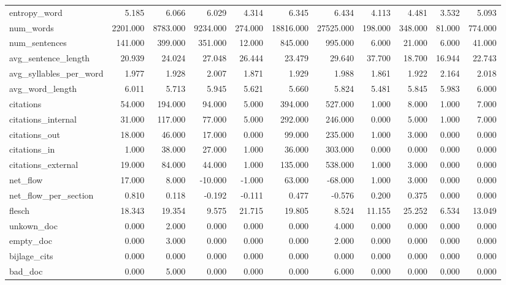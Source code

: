 \begin{tabular}{lrrrrrrrrrr}
\cline{1-11}
entropy\_word & 5.185 & 6.066 & 6.029 & 4.314 & 6.345 & 6.434 & 4.113 & 4.481 & 3.532 & 5.093 \\
\cline{1-11}
num\_words & 2201.000 & 8783.000 & 9234.000 & 274.000 & 18816.000 & 27525.000 & 198.000 & 348.000 & 81.000 & 774.000 \\
\cline{1-11}
num\_sentences & 141.000 & 399.000 & 351.000 & 12.000 & 845.000 & 995.000 & 6.000 & 21.000 & 6.000 & 41.000 \\
\cline{1-11}
avg\_sentence\_length & 20.939 & 24.024 & 27.048 & 26.444 & 23.479 & 29.640 & 37.700 & 18.700 & 16.944 & 22.743 \\
\cline{1-11}
avg\_syllables\_per\_word & 1.977 & 1.928 & 2.007 & 1.871 & 1.929 & 1.988 & 1.861 & 1.922 & 2.164 & 2.018 \\
\cline{1-11}
avg\_word\_length & 6.011 & 5.713 & 5.945 & 5.621 & 5.660 & 5.824 & 5.481 & 5.845 & 5.983 & 6.000 \\
\cline{1-11}
citations & 54.000 & 194.000 & 94.000 & 5.000 & 394.000 & 527.000 & 1.000 & 8.000 & 1.000 & 7.000 \\
\cline{1-11}
citations\_internal & 31.000 & 117.000 & 77.000 & 5.000 & 292.000 & 246.000 & 0.000 & 5.000 & 1.000 & 7.000 \\
\cline{1-11}
citations\_out & 18.000 & 46.000 & 17.000 & 0.000 & 99.000 & 235.000 & 1.000 & 3.000 & 0.000 & 0.000 \\
\cline{1-11}
citations\_in & 1.000 & 38.000 & 27.000 & 1.000 & 36.000 & 303.000 & 0.000 & 0.000 & 0.000 & 0.000 \\
\cline{1-11}
citations\_external & 19.000 & 84.000 & 44.000 & 1.000 & 135.000 & 538.000 & 1.000 & 3.000 & 0.000 & 0.000 \\
\cline{1-11}
net\_flow & 17.000 & 8.000 & -10.000 & -1.000 & 63.000 & -68.000 & 1.000 & 3.000 & 0.000 & 0.000 \\
\cline{1-11}
net\_flow\_per\_section & 0.810 & 0.118 & -0.192 & -0.111 & 0.477 & -0.576 & 0.200 & 0.375 & 0.000 & 0.000 \\
\cline{1-11}
flesch & 18.343 & 19.354 & 9.575 & 21.715 & 19.805 & 8.524 & 11.155 & 25.252 & 6.534 & 13.049 \\
\cline{1-11}
unkown\_doc & 0.000 & 2.000 & 0.000 & 0.000 & 0.000 & 4.000 & 0.000 & 0.000 & 0.000 & 0.000 \\
\cline{1-11}
empty\_doc & 0.000 & 3.000 & 0.000 & 0.000 & 0.000 & 2.000 & 0.000 & 0.000 & 0.000 & 0.000 \\
\cline{1-11}
bijlage\_cits & 0.000 & 0.000 & 0.000 & 0.000 & 0.000 & 0.000 & 0.000 & 0.000 & 0.000 & 0.000 \\
\cline{1-11}
bad\_doc & 0.000 & 5.000 & 0.000 & 0.000 & 0.000 & 6.000 & 0.000 & 0.000 & 0.000 & 0.000 \\
\cline{1-11}
\bottomrule
\end{tabular}
